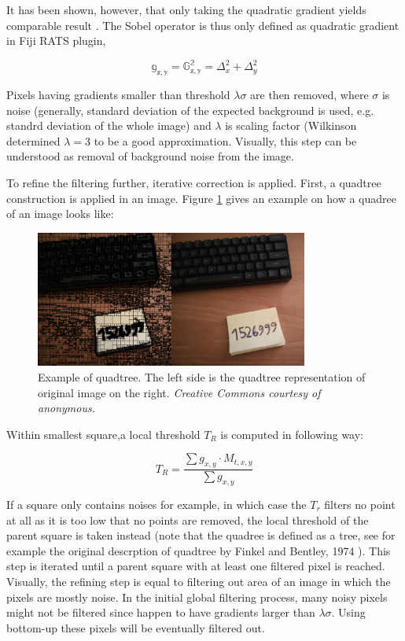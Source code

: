 \documentclass[pdftex,12pt,a4paper]{report}
\begin{document}
It has been shown, however, that only taking the quadratic gradient yields comparable result \cite{wilkinson1998digital}. The Sobel operator is thus only defined as quadratic gradient in Fiji RATS plugin,

$$
\mathbb{g_{x, y}} = \mathbb{G_{x, y}^2} = \Delta_x^2 + \Delta_y^2
$$

Pixels having gradients smaller than threshold $\lambda \sigma$ are then removed, where $\sigma$ is noise (generally, standard deviation of the expected background is used, e.g. standrd deviation of the whole image) and $\lambda$ is scaling factor (Wilkinson determined $\lambda = 3$ to be a good approximation. Visually, this step can be understood as removal of background noise from the image.

To refine the filtering further, iterative correction is applied. First, a quadtree construction is applied in an image. Figure \ref{fig:quadtree} gives an example on how a quadree of an image looks like:

\begin{figure}[H]
\centering
\includegraphics[width=0.8\textwidth]{images/quadtree}
\caption{Example of quadtree. The left side is the quadtree representation of original image on the right. \textit{Creative Commons courtesy of anonymous.}}
\label{fig:quadtree}
\end{figure}

Within smallest square,a local threshold $T_R$ is computed in following way:

\begin{equation}
T_R = \frac{\sum g_{x,y} \cdot M_{t, x, y}}{\sum g_{x, y}}
\label{eq:local_threshold_rats}
\end{equation}

If a square only contains noises for example, in which case the $T_r$ filters no point at all as it is too low that no points are removed, the local threshold of the parent square is taken instead (note that the quadree is defined as a tree, see for example the original descrption of quadtree by Finkel and Bentley, 1974 \cite{finkel1974quad}). This step is iterated until a parent square with at least one filtered pixel is reached. Visually, the refining step is equal to filtering out area of an image in which the pixels are mostly noise. In the initial global filtering process, many noisy pixels might not be filtered since happen to have gradients larger than $\lambda \sigma$. Using bottom-up these pixels will be eventually filtered out.
\end{document}
